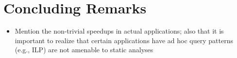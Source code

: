 \documentclass{llncs}
\begin{document}
\section{Concluding Remarks}
\begin{itemize}
\item Mention the non-trivial speedups in actual applications; also
  that it is important to realize that certain applications have ad
  hoc query patterns (e.g., ILP) are not amenable to static analyses
\end{itemize}



\end{document}
